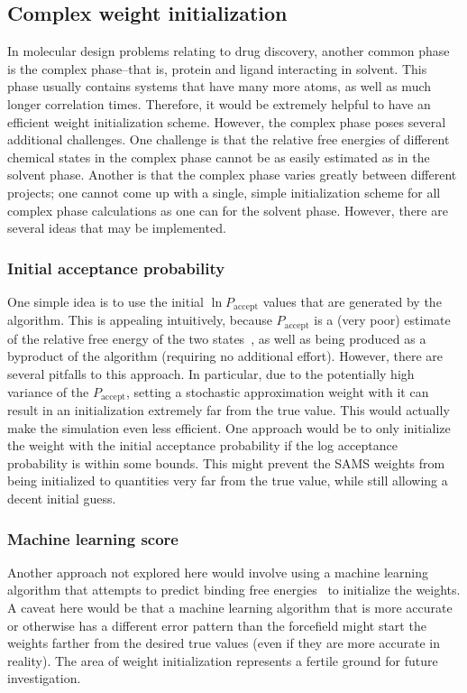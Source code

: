 \subsection{Complex weight initialization}
%
In molecular design problems relating to drug discovery, another common phase is the complex phase--that is, protein and ligand interacting in solvent.
%
This phase usually contains systems that have many more atoms, as well as much longer correlation times.
%
Therefore, it would be extremely helpful to have an efficient weight initialization scheme.
%
However, the complex phase poses several additional challenges.
%
One challenge is that the relative free energies of different chemical states in the complex phase cannot be as easily estimated as in the solvent phase.
%
Another is that the complex phase varies greatly between different projects; one cannot come up with a single, simple initialization scheme for all complex phase calculations as one can for the solvent phase.
%
However, there are several ideas that may be implemented.
%
%
\subsubsection{Initial acceptance probability}
%
One simple idea is to use the initial $\ln P_\mathrm{accept}$ values that are generated by the algorithm.
%
This is appealing intuitively, because $P_\mathrm{accept}$ is a (very poor) estimate of the relative free energy of the two states~\cite{Zwanzig1954}, as well as being produced as a byproduct of the algorithm (requiring no additional effort).
%
However, there are several pitfalls to this approach. 
%
In particular, due to the potentially high variance of the $P_\mathrm{accept}$, setting a stochastic approximation weight with it can result in an initialization extremely far from the true value.
%
This would actually make the simulation even less efficient.
%
One approach would be to only initialize the weight with the initial acceptance probability if the log acceptance probability is within some bounds.
%
This might prevent the SAMS weights from being initialized to quantities very far from the true value, while still allowing a decent initial guess.
%
%
\subsubsection{Machine learning score}
%
Another approach not explored here would involve using a machine learning algorithm that attempts to predict binding free energies~\cite{Colwell2018, Wu2018} to initialize the weights.
%
A caveat here would be that a machine learning algorithm that is more accurate or otherwise has a different error pattern than the forcefield might start the weights farther from the desired true values (even if they are more accurate in reality).
%
The area of weight initialization represents a fertile ground for future investigation.
%
